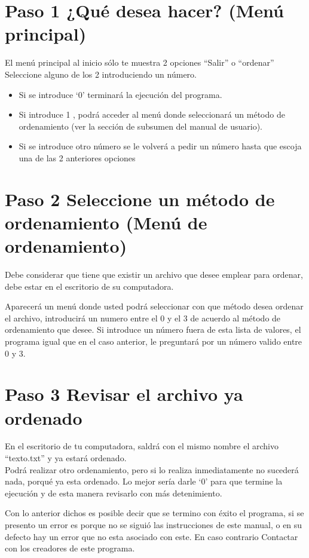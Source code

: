 \documentclass[12pt]{report}
\begin{document}
	\chapter{Paso 1 ¿Qué desea hacer? (Menú principal)}
	El menú principal al inicio sólo te muestra 2 opciones ``Salir'' o ``ordenar'' Seleccione alguno de los 2 introduciendo un número.
	\begin{itemize}
		\item Si se introduce `0' terminará la ejecución del programa.
		\item Si introduce 1 , podrá acceder al menú donde seleccionará un método de ordenamiento (ver la sección de subsumen del manual de usuario).
		\item Si se introduce otro número se le volverá a pedir un número hasta que escoja una de las 2 anteriores opciones
	\end{itemize}

	\chapter{Paso 2 Seleccione un método de ordenamiento (Menú de ordenamiento)}
	Debe considerar que tiene que existir un archivo que desee emplear para ordenar, debe estar en el escritorio de su computadora.
	
	Aparecerá un menú donde usted podrá seleccionar con que método desea ordenar el archivo, introducirá un numero entre el 0 y el 3 de acuerdo al método de ordenamiento que desee.
	Si introduce un número fuera de esta lista de valores, el programa igual que en el caso anterior, le preguntará por un número valido entre 0 y 3.

	\chapter{Paso 3 Revisar el archivo ya ordenado}
	En el escritorio de tu computadora, saldrá con el mismo nombre el archivo ``texto.txt'' y ya estará ordenado.
	\\Podrá realizar otro ordenamiento, pero si lo realiza inmediatamente no sucederá nada, porqué ya esta ordenado. Lo mejor sería  darle `0' para que termine la ejecución y de esta manera revisarlo con más detenimiento.
	
	Con lo anterior dichos es posible decir que se termino con éxito el programa, si se presento un error es porque no se siguió las instrucciones de este manual,
	o en su defecto hay un error que no esta asociado con este. 
	En caso contrario Contactar con los creadores de este  programa.
\end{document}
